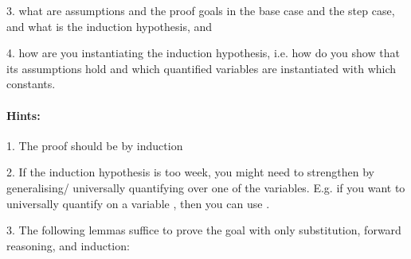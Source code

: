 \begin{isabellebody}
\begin{isamarkuptext}
 3. what are assumptions and the proof goals in the base case and the step case, and what is the
    induction hypothesis, and

 4. how are you instantiating the induction hypothesis, i.e. how do you show that its assumptions
    hold and which quantified variables are instantiated with which constants.

\paragraph{Hints:}
 1. The proof should be by induction

  2. If the induction hypothesis is too week, you might need to strengthen by generalising/
     universally quantifying over one of the variables. E.g. if you want to universally quantify on
     a variable , then you can use .

  3. The following lemmas suffice to prove the goal with only substitution, forward reasoning, and
     induction:



\end{isamarkuptext}
\end{isabellebody}
